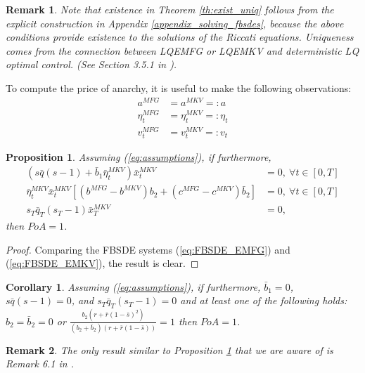 \documentclass[11pt]{article}
\newtheorem{remark}{Remark}
\newtheorem{proposition}{Proposition}
\newtheorem{corollary}{Corollary}
\begin{document}
\begin{remark}
    Note that existence in Theorem \ref{th:exist_uniq} follows from the explicit construction in Appendix \ref{appendix_solving_fbsdes}, because the above conditions provide existence to the solutions of the Riccati equations. Uniqueness comes from the connection between LQEMFG or LQEMKV and deterministic LQ optimal control. (See Section 3.5.1 in \cite{Carmona_book}).
\end{remark}

To compute the price of anarchy, it is useful to make the following observations:
\begin{equation*}
\begin{split}
    a^{MFG}&=a^{MKV}=:a \\
    \eta_t^{MFG}&=\eta_t^{MKV}=:\eta_t \\
    v_t^{MFG}&=v_t^{MKV}=:v_t
\end{split}
\end{equation*}

\begin{proposition}
Assuming (\ref{eq:assumptions}), if furthermore,
\begin{equation*}
\begin{split}
    \left(s\bar{q}(s-1)+\bar{b}_1\bar{\eta}_t^{MKV}\right)\bar{x}_t^{MKV}&=0,\ \forall t \in [0,T] \\
    \bar{\eta}_t^{MKV}\bar{x}_t^{MKV}\left[(b^{MFG}-b^{MKV})b_2+(c^{MFG}-c^{MKV})\bar{b}_2\right]&=0,\ \forall t \in [0,T] \\
    s_T\bar{q}_T(s_T-1)\bar{x}_T^{MKV}&=0,
\end{split}
\end{equation*}
then $PoA=1$.
\label{eq:lq_prop}
\end{proposition}

\begin{proof}
    Comparing the FBSDE systems (\ref{eq:FBSDE_EMFG}) and (\ref{eq:FBSDE_EMKV}), the result is clear.
\end{proof}

\begin{corollary}
Assuming (\ref{eq:assumptions}), if furthermore, $\bar{b}_1=0$, $s\bar{q}(s-1)=0$, and $s_T\bar{q}_T(s_T-1)=0$ and at least one of the following holds: $b_2=\bar{b}_2=0$ or $\frac{b_2(r+\bar{r}(1-\bar{s})^2)}{(b_2+\bar{b}_2)(r+\bar{r}(1-\bar{s}))}=1$
then $PoA=1$.
\label{corollary_1}
\end{corollary}

\begin{remark}
The only result similar to Proposition \ref{eq:lq_prop} that we are aware of is Remark 6.1 in \cite{nourian2013nash}.
\end{remark}
\end{document}
